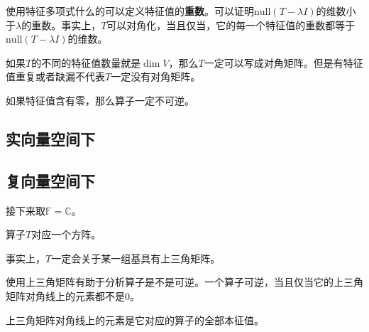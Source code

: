 使用特征多项式什么的可以定义特征值的\textbf{重数}。可以证明$\mathrm{null}(T-\lambda I)$的维数小于$\lambda$的重数。事实上，$T$可以对角化，当且仅当，它的每一个特征值的重数都等于$\mathrm{null}(T-\lambda I)$的维数。

如果$T$的不同的特征值数量就是$\dim V$，那么$T$一定可以写成对角矩阵。但是有特征值重复或者缺漏不代表$T$一定没有对角矩阵。

如果特征值含有零，那么算子一定不可逆。

\hypertarget{ux5b9eux5411ux91cfux7a7aux95f4ux4e0b}{%
\subsection{实向量空间下}\label{ux5b9eux5411ux91cfux7a7aux95f4ux4e0b}}

\hypertarget{ux590dux5411ux91cfux7a7aux95f4ux4e0b}{%
\subsection{复向量空间下}\label{ux590dux5411ux91cfux7a7aux95f4ux4e0b}}

接下来取$\mathbb{F} = \mathbb{C}$。

算子$T$对应一个方阵。

事实上，$T$一定会关于某一组基具有上三角矩阵。

使用上三角矩阵有助于分析算子是不是可逆。一个算子可逆，当且仅当它的上三角矩阵对角线上的元素都不是0。

上三角矩阵对角线上的元素是它对应的算子的全部本征值。
